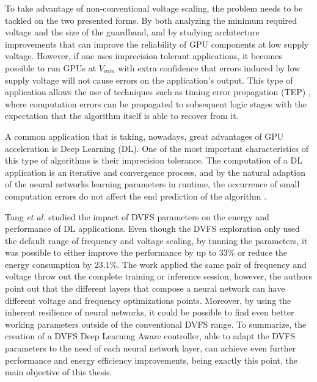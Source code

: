 To take advantage of non-conventional voltage scaling, the problem needs to be tackled on the two presented forms. By both analyzing the minimum required voltage and the size of the guardband, and by studying architecture improvements that can improve the reliability of GPU components at low supply voltage. However, if one uses imprecision tolerant applications, it becomes possible to run GPUs at $V_{min}$ with extra confidence that errors induced by low supply voltage will not cause errors on the application's output. This type of application allows the use of techniques such as timing error propagation (TEP) \cite{nakhaee_lifetime_2018}, where computation errors can be propagated to subsequent logic stages with the expectation that the algorithm itself is able to recover from it.

A common application that is taking, nowadays, great advantages of GPU acceleration is Deep Learning (DL). One of the most important characteristics of this type of algorithms is their imprecision tolerance. The computation of a DL application is an iterative and convergence process, and by the natural adaption of the neural networks learning parameters in runtime, the occurrence of small computation errors do not affect the end prediction of the algorithm \cite{jiao_assessment_2017}.

Tang \textit{et al.} \cite{tang_impact_2019} studied the impact of DVFS parameters on the energy and performance of DL applications. Even though the DVFS exploration only used the default range of frequency and voltage scaling, by tunning the parameters, it was possible to either improve the performance by up to 33\% or reduce the energy consumption by 23.1\%. The work applied the same pair of frequency and voltage throw out the complete training or inference session, however, the authors point out that the different layers that compose a neural network can have different voltage and frequency optimizations points. Moreover, by using the inherent resilience of neural networks, it could be possible to find even better working parameters outside of the conventional DVFS range. To summarize, the creation of a DVFS Deep Learning Aware controller, able to adapt the DVFS parameters to the need of each neural network layer, can achieve even further performance and energy efficiency improvements, being exactly this point, the main objective of this thesis.